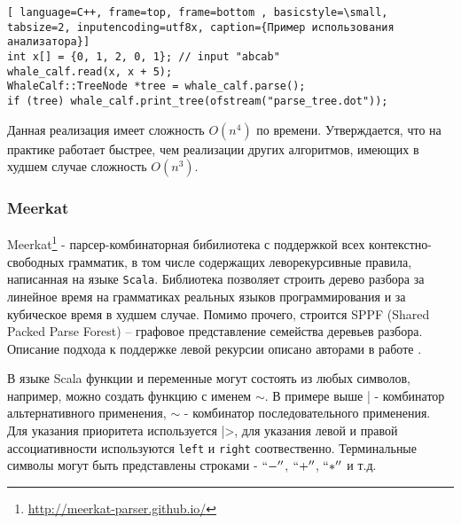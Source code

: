 \begin{lstlisting}[ language=C++, frame=top, frame=bottom , basicstyle=\small, tabsize=2, inputencoding=utf8x, caption={Пример использования анализатора}]
int x[] = {0, 1, 2, 0, 1}; // input "abcab"
whale_calf.read(x, x + 5);
WhaleCalf::TreeNode *tree = whale_calf.parse();
if (tree) whale_calf.print_tree(ofstream("parse_tree.dot"));
\end{lstlisting}

Данная реализация имеет сложность $O(n^{4})$ по времени. Утверждается, что на практике работает быстрее, чем реализации других алгоритмов, имеющих в худшем случае сложность $O(n^{3})$.


\subsubsection{Meerkat}
Meerkat\footnote{\url{http://meerkat-parser.github.io/}} - парсер-комбинаторная бибилиотека с поддержкой всех контекстно-свободных грамматик, в том числе содержащих леворекурсивные правила, написанная на языке {\tt Scala}. Библиотека позволяет строить дерево разбора за линейное время на грамматиках реальных языков программирования и за кубическое время в худшем случае. Помимо прочего, строится SPPF (Shared Packed Parse Forest) -- графовое представление семейства деревьев разбора. Описание подхода к поддержке левой рекурсии описано авторами в работе \cite{izmaylova2016practical}.

В языке Scala функции и переменные могут состоять из любых символов, например, можно создать функцию с именем $\sim$. В примере выше | - комбинатор альтернативного применения, $\sim$ - комбинатор последовательного применения. Для указания приоритета используется |>, для указания левой и правой ассоциативности используются \lstinline[language=Scala]{left} и \lstinline[language=Scala]{right} соотвественно. Терминальные символы могут быть представлены строками - $``-''$, $``+''$, $``*''$ и т.д.

